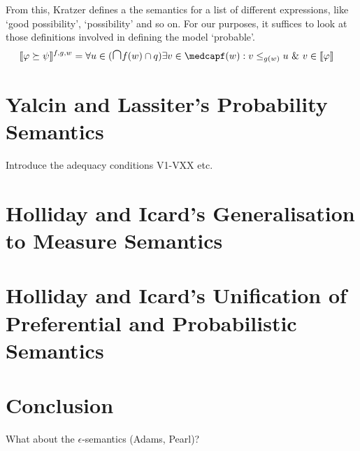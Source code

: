 \documentclass{article}
\newcommand*{\medcap}{\mathbin{\scalebox{1.5}{\ensuremath{\cap}}}}%
\begin{document}
From this, Kratzer defines a the semantics for a list of different expressions, like `good possibility', `possibility' and so on. For our purposes, it suffices to look at those definitions involved in defining the model `probable'.
\begin{align*}
 \llbracket \varphi \succeq \psi \rrbracket^{f,g,w} &= \forall u \in (\medcap f(w) \cap q) \exists v \in \medcapf(w): v \leq_{g(w)}u ~\&~ v \in \llbracket \varphi \rrbracket 
\end{align*}



\section{Yalcin and Lassiter's Probability Semantics}
Introduce the adequacy conditions V1-VXX etc.
\section{Holliday and Icard's Generalisation to Measure Semantics}
\section{Holliday and Icard's Unification of Preferential and Probabilistic Semantics}
\section{Conclusion}
What about the $\epsilon$-semantics (Adams, Pearl)? 
\nocite{hamblin59_modal_probab,holliday13_measur,harrison-trainor17_prefer,kratzer91_modal,lassiter10_gradab,yalcin10_probab_operat,kratzer98_seman}
 \printbibliography
\end{document}
